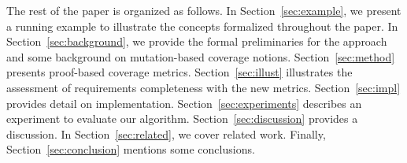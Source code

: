 The rest of the paper is organized as follows.  In Section~\ref{sec:example}, we present a running example to illustrate the concepts formalized throughout the paper.  In Section~\ref{sec:background}, we provide the formal preliminaries for the approach and some background on mutation-based coverage notions.  Section~\ref{sec:method} presents proof-based coverage metrics.
Section~\ref{sec:illust} illustrates the assessment of requirements completeness with the new metrics. Section~\ref{sec:impl} provides detail on implementation. Section~\ref{sec:experiments} describes an experiment to evaluate our algorithm.
Section~\ref{sec:discussion} provides a discussion.  In Section~\ref{sec:related}, we cover related work.  Finally, Section~\ref{sec:conclusion} mentions some conclusions.

